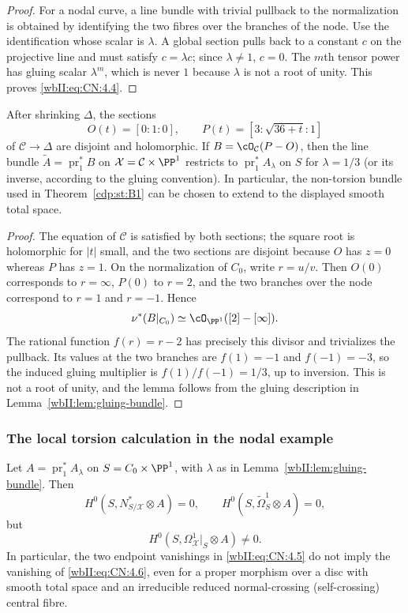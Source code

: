 \begin{proof}
For a nodal curve, a line bundle with trivial pullback to the normalization
is obtained by identifying the two fibres over the branches of the node.
Use the identification whose scalar is $\lambda$.  A global section pulls
back to a constant $c$ on the projective line and must satisfy
$c=\lambda c$; since $\lambda\ne1$, $c=0$.  The $m$th tensor power has
gluing scalar $\lambda^m$, which is never $1$ because $\lambda$ is not a
root of unity.  This proves \eqref{wbII:eq:CN:4.4}.
\end{proof}

\begin{lemma}
\label{wbII:lem:extending-gluing}
After shrinking $\Delta$, the sections
\[
 O(t)=[0:1:0],\qquad
 P(t)=[3:\sqrt{36+t}:1]
\tag{W.162}\label{wbII:eq:CN:4.5a}
\]
of $\mathcal C\to\Delta$ are disjoint and holomorphic.  If
$B=\cO_{\mathcal C}(P-O)$, then the line bundle
$\widetilde A=\operatorname{pr}_1^*B$ on $\mathcal X=\mathcal C\times\PP^1$
restricts to $\operatorname{pr}_1^*A_{\lambda}$ on $S$ for
$\lambda=1/3$ (or its inverse, according to the gluing convention).  In
particular, the non-torsion bundle used in Theorem~\ref{cdp:st:B1} can
be chosen to extend to the displayed smooth total space.
\end{lemma}

\begin{proof}
The equation of $\mathcal C$ is satisfied by both sections; the square root
is holomorphic for $|t|$ small, and the two sections are disjoint because
$O$ has $z=0$ whereas $P$ has $z=1$.  On the normalization of $C_0$, write
$r=u/v$.  Then $O(0)$ corresponds to $r=\infty$, $P(0)$ to $r=2$, and the
two branches over the node correspond to $r=1$ and $r=-1$.  Hence
\[
 \nu^*(B|_{C_0})\simeq\cO_{\PP^1}([2]-[\infty]).
\]
The rational function $f(r)=r-2$ has precisely this divisor and trivializes
the pullback.  Its values at the two branches are $f(1)=-1$ and
$f(-1)=-3$, so the induced gluing multiplier is $f(1)/f(-1)=1/3$,
up to inversion.  This is not a root of unity, and the lemma follows from
the gluing description in Lemma~\ref{wbII:lem:gluing-bundle}.
\end{proof}

\subsubsection*{The local torsion calculation in the nodal example}

Let $A=\operatorname{pr}_1^*A_\lambda$ on
$S=C_0\times\PP^1$, with $\lambda$ as in Lemma~\ref{wbII:lem:gluing-bundle}.
Then
\[
 H^0(S,N^*_{S/\mathcal X}\otimes A)=0,
 \qquad
 H^0(S,\widetilde\Omega^1_S\otimes A)=0,
 \tag{W.163}\label{wbII:eq:CN:4.5}
\]
but
\[
 H^0(S,\Omega^1_{\mathcal X}|_S\otimes A)\ne0.
 \tag{W.164}\label{wbII:eq:CN:4.6}
\]
In particular, the two endpoint vanishings in \eqref{wbII:eq:CN:4.5} do not imply the
vanishing of \eqref{wbII:eq:CN:4.6}, even for a proper morphism over a disc with smooth total
space and an irreducible reduced normal-crossing (self-crossing) central
fibre.


